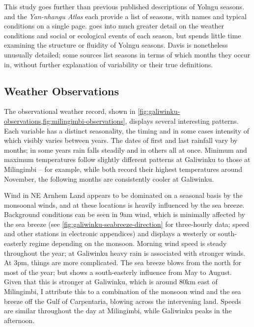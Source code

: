 This study goes further than previous published descriptions of Yolngu seasons.
\citet{barber2005} and the \textit{Yan-nhangu Atlas} \citep{atlas2014} each
provide a list of seasons, with names and typical conditions on a single page.
\citet{davis1989} goes into much greater detail on the weather conditions and
social or ecological events of each season, but spends little time examining
the structure or fluidity of Yolngu seasons.  Davis is nonetheless unusually
detailed; some sources \citep[eg.][]{BOM-iwk} list seasons in terms of which
months they occur in, without further explanation of variability or their true
definitions.



\subsection{Weather Observations}
\label{ssec:disc-weather}

The observational weather record, shown in
\cref{fig:galiwinku-observations,fig:milingimbi-observations}, displays
several interesting patterns.  Each variable has a distinct seasonality,
the timing and in some cases intensity of which visibly varies between
years.  The dates of first and last rainfall vary by months; in some
years rain falls steadily and in others all at once.
%
Minimum and maximum temperatures follow slightly different patterns at
Galiwinku to those at Milingimbi -- for example, while both record their
highest temperatures around November, the following months are consistently
cooler at Galiwinku.

Wind in NE Arnhem Land appears to be dominated on a seasonal basis by the
monsoonal winds, and at these locations is heavily influenced by the sea
breeze.  Background conditions can be seen in 9am wind, which is minimally
affected by the sea breeze (see \cref{fig:galiwinku-seabreeze-direction}
for three-hourly data; speed and other stations in electronic appendices)
and displays a westerly or south-easterly regime depending on the monsoon.
Morning wind speed is steady throughout the year; at Galiwinku heavy rain
is associated with stronger winds.
%
At 3pm, things are more complicated.  The sea breeze blows from the north
for most of the year; but shows a south-easterly influence from May to
August.  Given that this is stronger at Galiwinku, which is around 80km
east of Milingimbi, I attribute this to a combination of the monsoon wind
and the sea breeze off the Gulf of Carpentaria, blowing across the intervening
land.  Speeds are similar throughout the day at Milingimbi, while Galiwinku
peaks in the afternoon.



